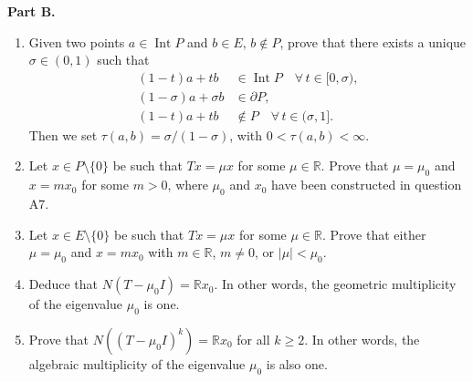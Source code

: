 \documentclass[12pt]{article}
\newcommand{\abs}[1]{\left|#1\right|}
\newcommand{\R}{\mathbb{R}}
\begin{document}
\noindent\textbf{Part B.}
 
\begin{enumerate}
\item Given two points $a \in \operatorname{Int} P$ and $b \in E$, $b \notin P$, prove that there exists a unique
$\sigma \in (0,1)$ such that
\begin{align*}
(1-t)a + tb &\in \operatorname{Int} P \quad \forall\, t \in [0,\sigma),\\
(1-\sigma)a + \sigma b &\in \partial P,\\
(1-t)a + tb &\notin P \quad \forall\, t \in (\sigma,1].
\end{align*}
Then we set $\tau(a,b) = \sigma/(1-\sigma)$, with $0 < \tau(a,b) < \infty$.
 
\item Let $x \in P \setminus \{0\}$ be such that $Tx = \mu x$ for some $\mu \in \R$.
Prove that $\mu = \mu_0$ and $x = m x_0$ for some $m > 0$, where $\mu_0$ and $x_0$ have
been constructed in question A7.
 
\noindent[\textit{Hint:} Suppose by contradiction that $x \neq mx_0$ $\forall\, m > 0$. Show that $\mu > 0$,
$x \in \operatorname{Int} P$, and $-x \notin P$. Set $y = x_0 - \tau_0 x$, where $\tau_0 = \tau(x_0,-x)$.
Compute $Ty$ and deduce that $\mu < \mu_0$. Then reverse the roles of $x_0$ and $x$.]
 
\item Let $x \in E \setminus \{0\}$ be such that $Tx = \mu x$ for some $\mu \in \R$.
Prove that either $\mu = \mu_0$ and $x = mx_0$ with $m \in \R$, $m \neq 0$, or
$\abs{\mu} < \mu_0$.
 
 
\item Deduce that $N(T - \mu_0 I) = \R x_0$. In other words, the geometric multiplicity of
the eigenvalue $\mu_0$ is one.
 
\item Prove that $N((T - \mu_0 I)^k) = \R x_0$ for all $k \ge 2$. In other words, the algebraic
multiplicity of the eigenvalue $\mu_0$ is also one.
 
\noindent[\textit{Hint:} In view of Problem 36, it suffices to show that $N((T-\mu_0 I)^2) = \R x_0$.]
\end{enumerate}
 
\bigskip
 
\end{document}
